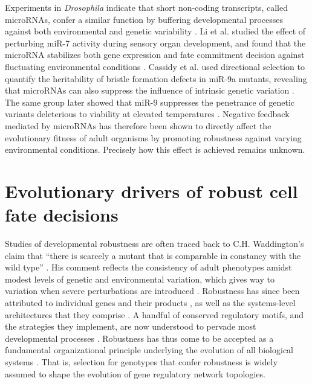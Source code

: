 Experiments in \textit{Drosophila} indicate that short non-coding transcripts, called microRNAs, confer a similar function by buffering developmental processes against both environmental and genetic variability \cite{Cassidy2016a,Cassidy2013,Li2009b,Ebert2012}. Li et al. studied the effect of perturbing miR-7 activity during sensory organ development, and found that the microRNA stabilizes both gene expression and fate commitment decision against fluctuating environmental conditions \cite{Li2009b}. Cassidy et al. used directional selection to quantify the heritability of bristle formation defects in miR-9a mutants, revealing that microRNAs can also suppress the influence of intrinsic genetic variation \cite{Cassidy2013}. The same group later showed that miR-9 suppresses the penetrance of genetic variants deleterious to viability at elevated temperatures \cite{Cassidy2016a}. Negative feedback mediated by microRNAs has therefore been shown to directly affect the evolutionary fitness of adult organisms by promoting robustness against varying environmental conditions. Precisely how this effect is achieved remains unknown.

\section{Evolutionary drivers of robust cell fate decisions}

Studies of developmental robustness are often traced back to C.H. Waddington’s claim that “there is scarcely a mutant that is comparable in constancy with the wild type” \cite{Waddington1942}. His comment reflects the consistency of adult phenotypes amidst modest levels of genetic and environmental variation, which gives way to variation when severe perturbations are introduced \cite{Bateman1959a,Rendel1959,Rendel1966a,Scharloo1991}. Robustness has since been attributed to individual genes and their products \cite{Dun1958,Gibson1996,Rutherford1998}, as well as the systems-level architectures that they comprise \cite{Rutherford1998,Paulsen2011,Li2009b,Eldar2002,Denby2012,Cassidy2013,Cassidy2016a}. A handful of conserved regulatory motifs, and the strategies they implement, are now understood to pervade most developmental processes \cite{Freeman2000,Hartman2001,Alon2007,Marciano2014}. Robustness has thus come to be accepted as a fundamental organizational principle underlying the evolution of all biological systems \cite{Kitano2004,Stelling2004}. That is, selection for genotypes that confer robustness is widely assumed to shape the evolution of gene regulatory network topologies. 

